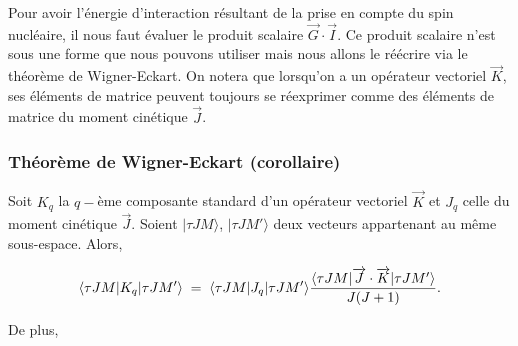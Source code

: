 Pour avoir l’énergie d’interaction résultant de la prise en compte du spin nucléaire, il nous faut évaluer le produit scalaire $\overrightarrow{G} \cdot \overrightarrow{I}$. Ce produit scalaire n’est sous une forme que nous pouvons utiliser mais nous allons le réécrire via le théorème de Wigner-Eckart. On notera que lorsqu’on a un opérateur vectoriel $\overrightarrow{K}$, ses éléments de matrice peuvent toujours se réexprimer comme des éléments de matrice du moment cinétique $\overrightarrow{J}$.



    \subsubsection{Théorème de Wigner-Eckart (corollaire)}



Soit $K_q$ la $q-$ème composante standard d'un opérateur vectoriel $\overrightarrow{K}$ et $J_q$ celle du moment cinétique $\overrightarrow{J}$. Soient $|\tau JM\rangle$, $|\tau JM'\rangle$ deux vecteurs appartenant au même sous-espace. Alors,

\begin{equation*}
    \langle\tau JM|K_q|\tau JM'\rangle \; = \;   \langle\tau JM|J_q|\tau JM'\rangle\dfrac{ \langle\tau JM|\overrightarrow{J}\cdot\overrightarrow{K}|\tau JM'\rangle}{J(J+1)}.
\end{equation*}

De plus, 

